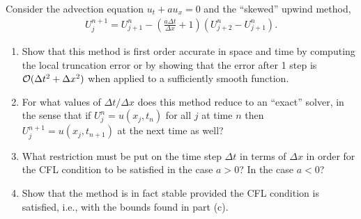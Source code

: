 \documentclass[10pt]{article}
\begin{document}
\begin{problem}
Consider the advection equation \( u_t + au_x = 0 \) and the ``skewed'' upwind method,
\begin{align*}
    U_j^{n+1} = U_{j+1}^n - \left( \frac{a\Delta t}{\Delta x}+1 \right)(U_{j+2}^n - U_{j+1}^n).
\end{align*}
\begin{enumerate}[label=(\alph*),nolistsep]
    \item Show that this method is first order accurate in space and time by computing the local truncation error or by showing that the error after 1 step is \( \mathcal{O}(\Delta t^2 + \Delta x^2) \) when applied to a sufficiently smooth function. 
    \item For what values of \( \Delta t/\Delta x \) does this method reduce to an ``exact'' solver, in the sense that if \( U_j^n = u(x_j,t_n ) \) for all \( j \) at time \( n \) then \( U_j^{n+1} = u(x_j,t_{n+1}) \) at the next time as well?
    \item What restriction must be put on the time step \( \Delta t \) in terms of \( \Delta x \) in order for the CFL condition to be satisfied in the case \( a>0 \)? In the case \( a<0 \)?
    \item Show that the method is in fact stable provided the CFL condition is satisfied, i.e., with the bounds found in part (c).
\end{enumerate}

\end{problem}
\end{document}
